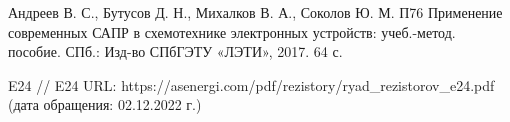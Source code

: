 
\begin{thebibliography}{2} 
	Андреев В. С., Бутусов Д. Н., Михалков В. А., Соколов Ю. М.
	П76 Применение современных САПР в схемотехнике электронных устройств: учеб.-метод. пособие. СПб.: Изд-во СПбГЭТУ «ЛЭТИ», 2017. 64 с.
	
	E24
	// E24
	URL: https://asenergi.com/pdf/rezistory/ryad\_rezistorov\_e24.pdf
	(дата обращения: 02.12.2022 г.)
\end{thebibliography}
